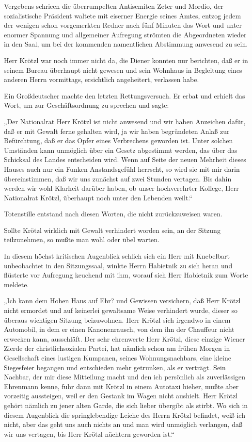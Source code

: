 Vergebens schrieen die überrumpelten Antisemiten Zeter und Mordio,
der sozialistische Präsident waltete mit eiserner Energie seines
Amtes, entzog jedem der wenigen schon vorgemerkten Redner nach fünf
Minuten das Wort und unter enormer Spannung und allgemeiner
Aufregung strömten die Abgeordneten wieder in den Saal, um bei der
kommenden namentlichen Abstimmung anwesend zu sein.

Herr Krötzl war noch immer nicht da, die Diener konnten nur
berichten, daß er in seinem Bureau überhaupt nicht gewesen und sein
Wohnhaus in Begleitung eines anderen Herrn vormittags, ersichtlich
angeheitert, verlassen habe.

Ein Großdeutscher machte den letzten Rettungsversuch. Er erbat und
erhielt das Wort, um zur Geschäftsordnung zu sprechen und sagte:

„Der Nationalrat Herr Krötzl ist nicht anwesend und wir haben
Anzeichen dafür, daß er mit Gewalt ferne gehalten wird, ja wir
haben begründeten Anlaß zur Befürchtung, daß er das Opfer eines
Verbrechens geworden ist. Unter solchen Umständen kann unmöglich
über ein Gesetz abgestimmt werden, das über das Schicksal des
Landes entscheiden wird. Wenn auf Seite der neuen Mehrheit dieses
Hauses auch nur ein Funken Anstandsgefühl herrscht, so wird sie mit
mir  darin übereinstimmen, daß wir uns zunächst auf
zwei Stunden vertagen. Bis dahin werden wir wohl Klarheit darüber
haben, ob unser hochverehrter Kollege, Herr Nationalrat Krötzl,
überhaupt noch unter den Lebenden weilt.“

Totenstille entstand nach diesen Worten, die nicht zurückzuweisen
waren.

Sollte Krötzl wirklich mit Gewalt verhindert worden sein, an der
Sitzung teilzunehmen, so mußte man wohl oder übel warten.

In diesem höchst kritischen Augenblick schlich sich ein Herr mit
Knebelbart unbeobachtet in den Sitzungssaal, winkte Herrn Habietnik
zu sich heran und flüsterte vor Aufregung keuchend mit ihm, worauf
sich Herr Habietnik zum Worte meldete.

„Ich kann dem Hohen Haus auf Ehr? und Gewissen versichern, daß Herr
Krötzl nicht ermordet und auf keinerlei gewaltsame Weise verhindert
wurde, dieser so überaus wichtigen Sitzung beizuwohnen. Herr Krötzl
 sich irgendwo in einem Automobil, in
dem er einen Kanonenrausch, von dem ihn der Chauffeur nicht
erwecken kann, ausschläft. Der sehr ehrenwerte Herr Krötzl, diese
einzige Wiener Zierde der christlichsozialen Partei, hat nämlich
schon am frühen Morgen in Gesellschaft eines lustigen Kumpanen,
seines Wohnungsnachbars, eine kleine Siegesfeier begangen und
entschieden mehr getrunken, als er verträgt. Sein Nachbar, der mir
diese Mitteilung macht und den ich persönlich als zuverlässigen
Ehrenmann kenne, fuhr dann mit Krötzl in einem Autotaxi hieher,
mußte aber vorzeitig aussteigen, weil er den Gestank im Wagen nicht
aushielt. Herr Krötzl  gehört nämlich zu jener
alten Garde, die sich lieber übergibt als stirbt. Wo sich in diesem
Augenblick die springlebendige Leiche des Herrn Krötzl befindet,
weiß ich nicht, aber das geht uns auch nichts an und man wird
unmöglich verlangen, daß wir uns vertagen, bis Herr Krötzl nüchtern
geworden ist.“

